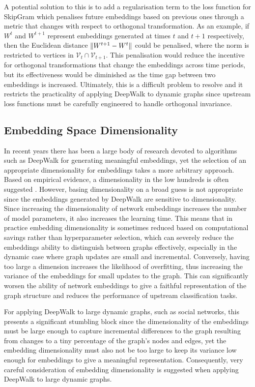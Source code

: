 \documentclass[a4paper]{article}
\renewcommand{\V}{\mathcal V}
\begin{document}
A potential solution to this is to add a regularisation term to the loss function for SkipGram which penalises future embeddings based on previous ones through a metric that changes with respect to orthogonal
transformation. As an example, if $W^t$ and $W^{t+1}$ represent embeddings generated at times $t$ and $t+1$ respectively, then the Euclidean distance $\lVert W^{t+1} - W^t\rVert$ could be penalised,
where the norm is restricted to vertices in $\V_t \cap \V_{t+1}$. This penalisation would reduce the incentive for orthogonal transformations that change the embeddings across time periods, but its
effectiveness would be diminished as the time gap between two embeddings is increased. Ultimately, this is a difficult problem to resolve and it restricts the practicality of applying DeepWalk to dynamic graphs since upstream loss functions must be carefully engineered to handle orthogonal invariance.
\subsection{Embedding Space Dimensionality}
In recent years there has been a large body of research devoted to algorithms such as DeepWalk for generating meaningful embeddings, yet the selection of an appropriate dimensionality for embeddings
takes a more arbitrary approach. Based on empirical evidence, a dimensionality in the low hundreds is often suggested \cite{bradford2008}
. However, basing dimensionality on a broad guess is not appropriate since the embeddings generated by DeepWalk are sensitive to dimensionality.\\
Since increasing the dimensionality of network embeddings increases the number of model parameters, it also increases the learning time. This means that
in practice embedding dimensionality is sometimes reduced based on computational savings rather than hyperparameter selection, which can severely reduce the embeddings ability to
distinguish between graphs effectively, especially in the dynamic case where graph updates are small and incremental.
Conversely, having too large a dimension increases the likelihood of overfitting, thus increasing the variance of the embeddings for small updates to the graph. This can significantly
worsen the ability of network embeddings to give a faithful representation of the graph structure and reduces the performance of upstream classification
tasks.

For applying DeepWalk to large dynamic graphs, such as social networks, this presents a significant stumbling block since the dimensionality of the embeddings must be large enough to capture incremental differences
to the graph resulting from changes to a tiny percentage of the graph's nodes and edges, yet the embedding dimensionality must also not be too large to keep its variance low enough for embeddings to
give a meaningful representation. Consequently, very careful consideration of embedding dimensionality is suggested when applying DeepWalk to large dynamic graphs.
\end{document}
